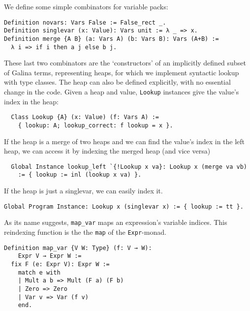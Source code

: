 \documentclass[a4paper,10pt,runningheads]{llncs}
\begin{document}

\noindent We define some simple combinators for variable packs:
%
\begin{lstlisting}
Definition novars: Vars False := False_rect _.
Definition singlevar (x: Value): Vars unit := λ _ => x.
Definition merge {A B} (a: Vars A) (b: Vars B): Vars (A+B) :=
  λ i => if i then a j else b j.
\end{lstlisting}


\noindent These last two combinators are the `constructors' of an implicitly defined subset of
 Galina terms, representing heaps, for which we implement syntactic lookup with type classes.
The heap can also be defined explicitly, with no essential change in the code.
Given a heap and value, \lstinline|Lookup| instances give the value's index in the heap:
\begin{lstlisting}
  Class Lookup {A} (x: Value) (f: Vars A) :=
    { lookup: A; lookup_correct: f lookup = x }.
\end{lstlisting}


If the heap is a merge of two heaps and we can find the value's index in the left heap, we can
access it by indexing the merged heap (and vice versa)
\begin{lstlisting}
  Global Instance lookup_left `{!Lookup x va}: Lookup x (merge va vb)
    := { lookup := inl (lookup x va) }.
\end{lstlisting}

If the heap is just a singlevar, we can easily index it.
\begin{lstlisting}
Global Program Instance: Lookup x (singlevar x) := { lookup := tt }.
\end{lstlisting}


 As its name suggests, \lstinline|map_var| maps an expression's variable indices.
This reindexing function is the the \lstinline|map| of the \lstinline|Expr|-monad.

\begin{lstlisting}
Definition map_var {V W: Type} (f: V → W):
    Expr V → Expr W :=
  fix F (e: Expr V): Expr W :=
    match e with
    | Mult a b => Mult (F a) (F b)
    | Zero => Zero
    | Var v => Var (f v)
    end.
\end{lstlisting}
\end{document}
